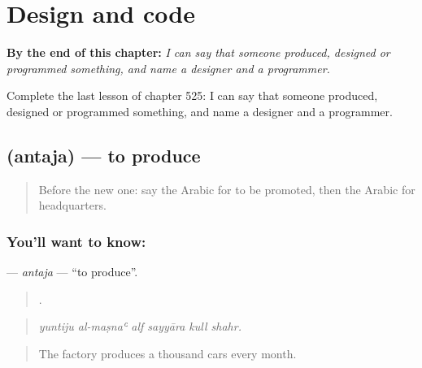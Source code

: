 
\chapter{Design and code}
\label{ch:ar-design-and-code}

\begin{chapteropening}
\textbf{By the end of this chapter:} \emph{I can say that someone produced, designed or programmed something, and name a designer and a programmer.}

Complete the last lesson of chapter 525: I can say that someone produced, designed or programmed something, and name a designer and a programmer.
\end{chapteropening}

\section[\texorpdfstring{\ar{أنتج} (antaja)}{أنتج (antaja)}]{ (antaja) — to produce}

\label{lesson:AR-C525-antaja}



\begin{quote}
Before the new one: say the Arabic for to be promoted, then the Arabic for headquarters.
\end{quote}

\subsection*{You'll want to know: }
\textbf{} — \emph{antaja} — \textquotedblleft{}to produce\textquotedblright{}.

\begin{quote}
     .
\end{quote}

\begin{quote}
\emph{yuntiju al-maṣnaʿ alf sayyāra kull shahr.}
\end{quote}

\begin{quote}
The factory produces a thousand cars every month.
\end{quote}

